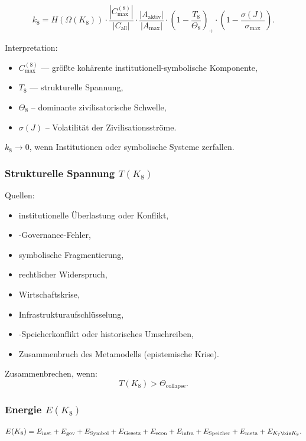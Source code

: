 \[
k_8 =
H(\Omega(K_8))
\cdot
\frac{|C_{\max}^{(8)}|}{|C_{\mathrm{all}}|}
\cdot
\frac{|A_{\mathrm{aktiv}}|}{|A_{\max}|}
\cdot
\left(1-\frac{T_8}{\Theta_8}\right)_+
\cdot
\left(1-\frac{\sigma(J)}{\sigma_{\max}}\right).
\]

Interpretation:
\begin{itemize}
    \item $C_{\max}^{(8)}$ — größte kohärente institutionell-symbolische Komponente,
    \item $T_8$ — strukturelle Spannung,
    \item $\Theta_8$ – dominante zivilisatorische Schwelle,
    \item $\sigma(J)$ – Volatilität der Zivilisationsströme.
\end{itemize}

$k_8 \to 0$, wenn Institutionen oder symbolische Systeme zerfallen.

\subsubsection{Strukturelle Spannung \texorpdfstring{$T(K_8)$}{T(K_8)}}

Quellen:
\begin{itemize}
    \item institutionelle Überlastung oder Konflikt,
    \item-Governance-Fehler,
    \item symbolische Fragmentierung,
    \item rechtlicher Widerspruch,
    \item Wirtschaftskrise,
    \item Infrastrukturaufschlüsselung,
    \item-Speicherkonflikt oder historisches Umschreiben,
    \item Zusammenbruch des Metamodells (epistemische Krise).
\end{itemize}

Zusammenbrechen, wenn:
\[
T(K_8) > \Theta_{\mathrm{collapse}}.
\]

\subsubsection{Energie \texorpdfstring{$E(K_8)$}{E(K_8)}}

\[
E(K_8)=
E_{\mathrm{inst}}+
E_{\mathrm{gov}}+
E_{\mathrm{Symbol}}+
E_{\mathrm{Gesetz}}+
E_{\mathrm{econ}}+
E_{\mathrm{infra}}+
E_{\mathrm{Speicher}}+
E_{\mathrm{meta}}+
E_{K_7\bis K_8}.
\]

